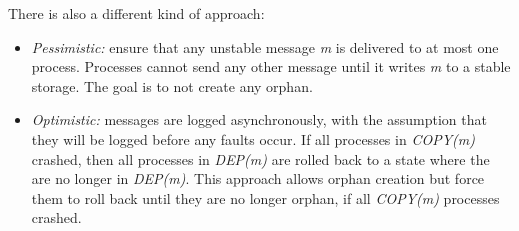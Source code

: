 There is also a different kind of approach:

\begin{itemize}
\itemsep1pt\parskip0pt
\item
  \emph{Pessimistic:} ensure that any unstable message \emph{m} is
  delivered to at most one process. Processes cannot send any other
  message until it writes \emph{m} to a stable storage. The goal is to
  not create any orphan.
\item
  \emph{Optimistic:} messages are logged asynchronously, with the
  assumption that they will be logged before any faults occur. If all
  processes in \emph{COPY(m)} crashed, then all processes in
  \emph{DEP(m)} are rolled back to a state where the are no longer in
  \emph{DEP(m)}. This approach allows orphan creation but force them to
  roll back until they are no longer orphan, if all \emph{COPY(m)}
  processes crashed.
\end{itemize}
